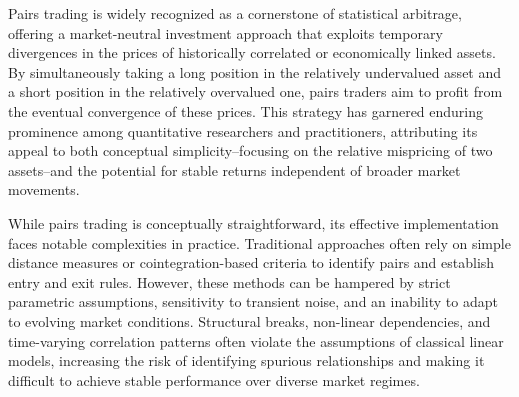 

Pairs trading is widely recognized as a cornerstone of statistical arbitrage, offering a market-neutral investment approach that exploits temporary divergences in the prices of historically correlated or economically linked assets.
%
%
By simultaneously taking a long position in the relatively undervalued asset and a short position in the relatively overvalued one, pairs traders aim to profit from the eventual convergence of these prices. This strategy has garnered enduring prominence among quantitative researchers and practitioners, attributing its appeal to both conceptual simplicity--focusing on the relative mispricing of two assets--and the potential for stable returns independent of broader market movements.


While pairs trading is conceptually straightforward, its effective implementation faces notable complexities in practice. Traditional approaches often rely on simple distance measures or cointegration-based criteria to identify pairs and establish entry and exit rules. However, these methods can be hampered by strict parametric assumptions, sensitivity to transient noise, and an inability to adapt to evolving market conditions. Structural breaks, non-linear dependencies, and time-varying correlation patterns often violate the assumptions of classical linear models, increasing the risk of identifying spurious relationships and making it difficult to achieve stable performance over diverse market regimes.




